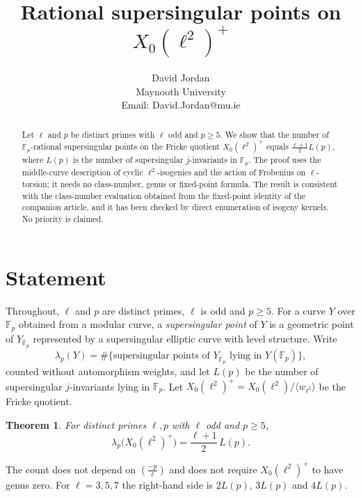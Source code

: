\documentclass[11pt,a4paper]{article}
\title{Rational supersingular points on $X_0(\ell^2)^+$}
\author{David Jordan\\\small Maynooth University\\\small Email: David.Jordan@mu.ie}
\date{}
\newtheorem{theorem}{Theorem}[section]
\theoremstyle{remark}\newtheorem{remark}[theorem]{Remark}
\numberwithin{equation}{section}
\newcommand{\Fp}{\mathbb F_p}
\newcommand{\kk}{\overline{\mathbb F}_p}
\newcommand{\leg}[2]{\left(\frac{#1}{#2}\right)}
\begin{document}
\maketitle
\begin{abstract}
Let $\ell$ and $p$ be distinct primes with $\ell$ odd and $p\geq5$. We show that the number of $\Fp$-rational supersingular points on the Fricke quotient $X_0(\ell^2)^+$ equals $\tfrac{\ell+1}{2}L(p)$, where $L(p)$ is the number of supersingular $j$-invariants in $\Fp$. The proof uses the middle-curve description of cyclic $\ell^2$-isogenies and the action of Frobenius on $\ell$-torsion; it needs no class-number, genus or fixed-point formula. The result is consistent with the class-number evaluation obtained from the fixed-point identity of the companion article, and it has been checked by direct enumeration of isogeny kernels. No priority is claimed.
\end{abstract}

\section{Statement}
Throughout, $\ell$ and $p$ are distinct primes, $\ell$ is odd and $p\geq5$. For a curve $Y$ over $\Fp$ obtained from a modular curve, a \emph{supersingular point} of $Y$ is a geometric point of $Y_{\kk}$ represented by a supersingular elliptic curve with level structure. Write
\[
\lambda_p(Y)=\#\{\text{supersingular points of }Y_{\kk}\text{ lying in }Y(\Fp)\},
\]
counted without automorphism weights, and let $L(p)$ be the number of supersingular $j$-invariants lying in $\Fp$. Let $X_0(\ell^2)^+=X_0(\ell^2)/\langle w_{\ell^2}\rangle$ be the Fricke quotient.

\begin{theorem}\label{thm:main}
For distinct primes $\ell,p$ with $\ell$ odd and $p\geq5$,
\[
\lambda_p\bigl(X_0(\ell^2)^+\bigr)=\frac{\ell+1}{2}\,L(p).
\]
\end{theorem}

The count does not depend on $\leg{-p}{\ell}$ and does not require $X_0(\ell^2)^+$ to have genus zero. For $\ell=3,5,7$ the right-hand side is $2L(p)$, $3L(p)$ and $4L(p)$.
\end{document}
